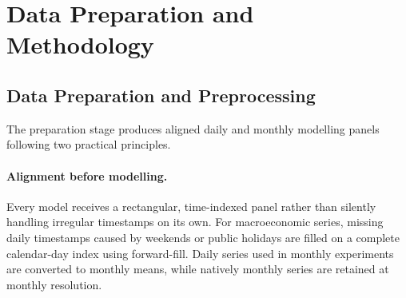 \documentclass[12pt,a4paper]{article}
\begin{document}
\begin{table}[H]
\centering
\caption{Interpretive grouping of the exogenous features.}\label{tab:feature-groups}
\small
{}
\end{table}

\section{Data Preparation and Methodology}\label{sec:methodology}

\subsection{Data Preparation and Preprocessing}

The preparation stage produces aligned daily and monthly modelling panels following two practical principles.

\paragraph{Alignment before modelling.} Every model receives a rectangular, time-indexed panel rather than silently handling irregular timestamps on its own. For macroeconomic series, missing daily timestamps caused by weekends or public holidays are filled on a complete calendar-day index using forward-fill. Daily series used in monthly experiments are converted to monthly means, while natively monthly series are retained at monthly resolution.
\end{document}
